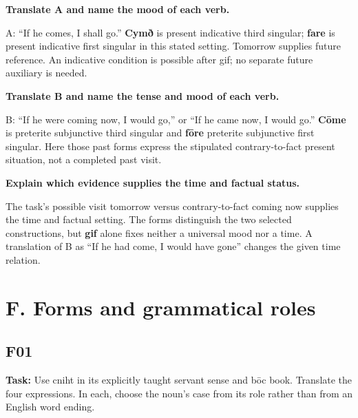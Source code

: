 \textbf{Translate A and name the mood of each verb.}

A: “If he comes, I shall go.” \textbf{Cymð} is present indicative third singular; \textbf{fare} is present indicative first singular in this stated setting. Tomorrow supplies future reference. An indicative condition is possible after gif; no separate future auxiliary is needed.

\textbf{Translate B and name the tense and mood of each verb.}

B: “If he were coming now, I would go,” or “If he came now, I would go.” \textbf{Cōme} is preterite subjunctive third singular and \textbf{fōre} preterite subjunctive first singular. Here those past forms express the stipulated contrary-to-fact present situation, not a completed past visit.

\textbf{Explain which evidence supplies the time and factual status.}

The task's possible visit tomorrow versus contrary-to-fact coming now supplies the time and factual setting. The forms distinguish the two selected constructions, but \textbf{gif} alone fixes neither a universal mood nor a time. A translation of B as “If he had come, I would have gone” changes the given time relation.

\section*{F. Forms and grammatical roles}

\subsection*{F01}

\textbf{Task:} Use cniht in its explicitly taught servant sense and bōc book. Translate the four expressions. In each, choose the noun's case from its role rather than from an English word ending.

